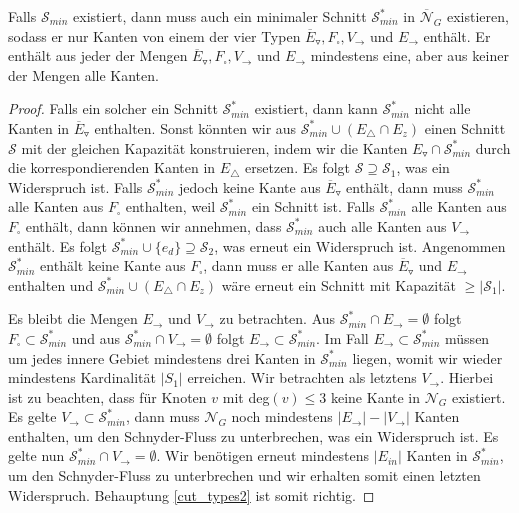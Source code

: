 \begin{claim}\label{cut_types2}
Falls $\mathcal{S}_{min}$ existiert, dann muss auch ein minimaler Schnitt $\mathcal{S}_{min}^*$ in $\overline{\mathcal{N}}_G$ existieren, sodass er nur Kanten von einem der vier Typen $\overline{E}_\triangledown, F_\square, V_\to$ und $E_\to$ enthält. Er enthält aus jeder der Mengen $\overline{E}_\triangledown, F_\square, V_\to$ und $E_\to$ mindestens eine, aber aus keiner der Mengen alle Kanten.
\end{claim}

\begin{proof}
Falls ein solcher ein Schnitt $\mathcal{S}_{min}^*$ existiert, dann kann $\mathcal{S}_{min}^*$ nicht alle Kanten in $\overline{E}_\triangledown$ enthalten. Sonst könnten wir aus $\mathcal{S}^*_{min} \cup (E_\triangle \cap E_z)$ einen Schnitt $\mathcal{S}$ mit der gleichen Kapazität konstruieren, indem wir die Kanten $E_\triangledown \cap \mathcal{S}^*_{min}$ durch die korrespondierenden Kanten in $E_\triangle$ ersetzen. Es folgt $\mathcal{S} \supseteq\mathcal{S}_1$, was ein Widerspruch ist. Falls $\mathcal{S}_{min}^*$ jedoch keine Kante aus $\overline{E}_\triangledown$ enthält, dann muss $\mathcal{S}_{min}^*$ alle Kanten aus $F_\square$ enthalten, weil $\mathcal{S}_{min}^*$ ein Schnitt ist. Falls $\mathcal{S}_{min}^*$ alle Kanten aus $F_\square$ enthält, dann können wir annehmen, dass $\mathcal{S}_{min}^*$ auch alle Kanten aus $V_\to$ enthält. Es folgt $\mathcal{S}^*_{min} \cup \{e_d\} \supseteq \mathcal{S}_2$, was erneut ein Widerspruch ist. Angenommen $\mathcal{S}_{min}^*$ enthält keine Kante aus $F_\square$, dann muss er alle Kanten aus $\overline{E}_\triangledown$ und $E_\to$ enthalten und $\mathcal{S}^*_{min} \cup (E_\triangle \cap E_z)$ wäre erneut ein Schnitt mit Kapazität $\geq |\mathcal{S}_1|$. 

Es bleibt die Mengen $E_\to$ und $V_\to$ zu betrachten. Aus $\mathcal{S}_{min}^*\cap E_\to = \emptyset $ folgt $F_\square\subset\mathcal{S}_{min}^*$ und aus $\mathcal{S}_{min}^*\cap V_\to = \emptyset $ folgt $E_\to \subset  \mathcal{S}_{min}^*$. Im Fall $E_\to \subset  \mathcal{S}_{min}^*$ müssen um jedes innere Gebiet mindestens drei Kanten in $\mathcal{S}_{min}^*$ liegen, womit wir wieder mindestens Kardinalität $|S_1|$ erreichen. Wir betrachten als letztens $V_\to$. Hierbei ist zu beachten, dass für Knoten $v$ mit deg$(v) \leq 3$ keine Kante in $\mathcal{N}_G$ existiert. Es gelte $V_\to \subset  \mathcal{S}_{min}^*$, dann muss $\mathcal{N}_G$ noch mindestens $|E_\to|-|V_\to|$ Kanten enthalten, um den Schnyder-Fluss zu unterbrechen, was ein Widerspruch ist. Es gelte nun $\mathcal{S}_{min}^*\cap V_\to = \emptyset$. Wir benötigen erneut mindestens $|E_{in}|$ Kanten in $\mathcal{S}_{min}^*$, um den Schnyder-Fluss zu unterbrechen und wir erhalten somit einen letzten Widerspruch. Behauptung \ref{cut_types2} ist somit richtig.
\end{proof}

